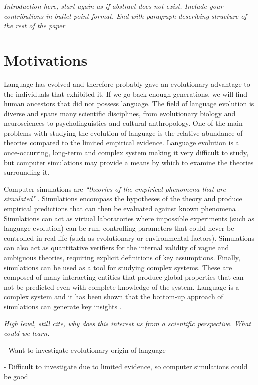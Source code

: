 \documentclass[12pt,a4paper,twoside,openright]{report}
\begin{document}
\emph{Introduction here, start again as if abstract does not exist. Include your contributions in bullet point format. End with paragraph describing structure of the rest of the paper}

\section{Motivations}

Language has evolved and therefore probably gave an evolutionary advantage to the individuals that exhibited it. If we go back enough generations, we will find human ancestors that did not possess language. The field of language evolution is diverse and spans many scientific disciplines, from evolutionary biology and neurosciences to psycholinguistics and cultural anthropology. One of the main problems with studying the evolution of language is the relative abundance of theories compared to the limited empirical evidence. Language evolution is a once-occurring, long-term and complex system making it very difficult to study, but computer simulations may provide a means by which to examine the theories surrounding it.

Computer simulations are \emph{``theories of the empirical phenomena that are simulated"} \citep{cangelosi2012simulating}. Simulations encompass the hypotheses of the theory and produce empirical predictions that can then be evaluated against known phenomena \citet{cavalli1997genes}. Simulations can act as virtual laboratories where impossible experiments (such as language evolution) can be run, controlling parameters that could never be controlled in real life (such as evolutionary or environmental factors). Simulations can also act as quantitative verifiers for the internal validity of vague and ambiguous theories, requiring explicit definitions of key assumptions. Finally, simulations can be used as a tool for studying complex systems. These are composed of many interacting entities that produce global properties that can not be predicted even with complete knowledge of the system. Language is a complex system and it has been shown that the bottom-up approach of simulations can generate key insights \citep{langton1997artificial}.

\emph{High level, still cite, why does this interest us from a scientific perspective. What could we learn.}

- Want to investigate evolutionary origin of language

- Difficult to investigate due to limited evidence, so computer simulations could be good
\end{document}
